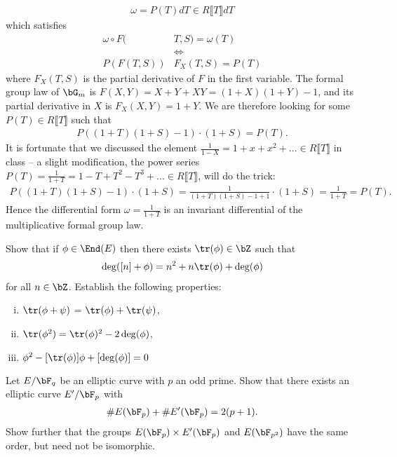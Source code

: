 \begin{homework}[e]
\begin{prf}
\begin{align*}
			\omega = P(T)dT \in R\llbracket T\rrbracket dT
		\end{align*}
		which satisfies
		\begin{align*}
			\omega \circ F(&T,S) = \omega(T) \\
						   &\iff \\
			P(F(T,S))&F_X(T,S) = P(T)
		\end{align*}
		where $F_X(T,S)$ is the partial derivative of $F$ in the first variable. The formal group law of $\bG_m$ is $F(X,Y) = X + Y + XY = (1 + X)(1 + Y) -1$, and its partial derivative in $X$ is $F_X(X,Y) = 1 + Y$. We are therefore looking for some $P(T) \in R\llbracket T\rrbracket$ such that
		\begin{align*}
			P((1+T)(1+S)-1) \cdot (1+S) = P(T).
		\end{align*}
		It is fortunate that we discussed the element $\frac{1}{1 - X} = 1 + x + x^2 + ... \in R\llbracket T\rrbracket$ in class -- a slight modification, the power series $P(T) = \frac{1}{1 + T} = 1 - T + T^2 - T^3 + ... \in R\llbracket T\rrbracket$, will do the trick:
		\begin{align*}
			P((1+T)(1+S)-1)\cdot (1 + S) = \frac{1}{(1+T)(1+S) - 1 + 1}\cdot (1 + S) = \frac{1}{1 + T} = P(T).
		\end{align*}
		Hence the differential form $\omega = \frac{1}{1 + T}$ is an invariant differential of the multiplicative formal group law.
	\end{prf}

	 Show that if $\phi\in \End(E)$ then there exists $\tr(\phi) \in \bZ$ such that 
	\begin{align*}
		\deg([n] + \phi) = n^2 + n\tr(\phi) + \deg(\phi)
	\end{align*}
	for all $n\in \bZ$. Establish the following properties:
	\begin{enumerate}[(i)]
		\item $\tr(\phi+\psi)$ = $\tr(\phi) + \tr(\psi)$,
		\item $\tr(\phi^2) = \tr(\phi)^2 - 2\deg(\phi)$,
        \item $\phi^2 - [\tr(\phi)]\phi + [\deg(\phi)] = 0$
	\end{enumerate}

	 Let $E/\bF_q$ be an elliptic curve with $p$ an odd prime. Show that there exists an elliptic curve $E'/\bF_p$ with
	\begin{align*}
		\# E(\bF_p) + \#E'(\bF_p) = 2(p+1).
	\end{align*}
	Show further that the groups $E(\bF_p) \times E'(\bF_p)$ and $E(\bF_{p^2})$ have the same order, but need not be isomorphic.


\end{homework}
